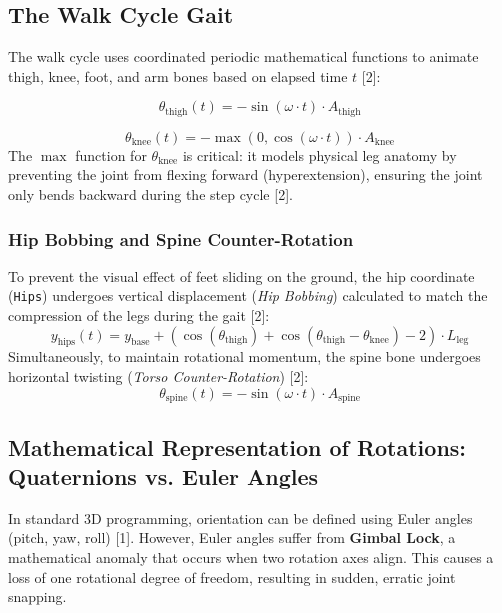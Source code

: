 \documentclass[11pt,a4paper,oneside]{article}
\begin{document}
\subsection{The Walk Cycle Gait}
The walk cycle uses coordinated periodic mathematical functions to animate thigh, knee, foot, and arm bones based on elapsed time $t$ [2]:

\begin{equation}
    \theta_{\text{thigh}}(t) = - \sin(\omega \cdot t) \cdot A_{\text{thigh}}
\end{equation}

\begin{equation}
    \theta_{\text{knee}}(t) = - \max(0, \cos(\omega \cdot t)) \cdot A_{\text{knee}}
\end{equation}
The $\max$ function for $\theta_{\text{knee}}$ is critical: it models physical leg anatomy by preventing the joint from flexing forward (hyperextension), ensuring the joint only bends backward during the step cycle [2].

\subsubsection{Hip Bobbing and Spine Counter-Rotation}
To prevent the visual effect of feet sliding on the ground, the hip coordinate (\texttt{Hips}) undergoes vertical displacement (\emph{Hip Bobbing}) calculated to match the compression of the legs during the gait [2]:
\begin{equation}
    y_{\text{hips}}(t) = y_{\text{base}} + \left( \cos(\theta_{\text{thigh}}) + \cos(\theta_{\text{thigh}} - \theta_{\text{knee}}) - 2 \right) \cdot L_{\text{leg}}
\end{equation}
Simultaneously, to maintain rotational momentum, the spine bone undergoes horizontal twisting (\emph{Torso Counter-Rotation}) [2]:
\begin{equation}
    \theta_{\text{spine}}(t) = - \sin(\omega \cdot t) \cdot A_{\text{spine}}
\end{equation}

\subsection{Mathematical Representation of Rotations: Quaternions vs. Euler Angles}
In standard 3D programming, orientation can be defined using Euler angles (pitch, yaw, roll) [1]. However, Euler angles suffer from \textbf{Gimbal Lock}, a mathematical anomaly that occurs when two rotation axes align. This causes a loss of one rotational degree of freedom, resulting in sudden, erratic joint snapping.
\end{document}
